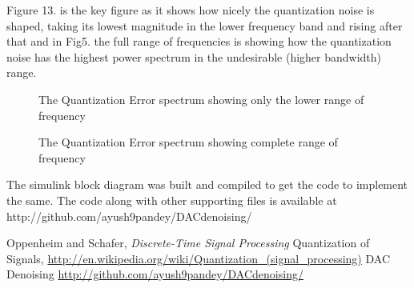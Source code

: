\documentclass[colorlinks=true,pdfstartview=FitV,linkcolor=blue,
            citecolor=red,urlcolor=magenta]{ligodoc}
\begin{document}
Figure 13. is the key figure as it shows how nicely the quantization noise is shaped, taking its lowest magnitude in the lower frequency band and rising after that and in Fig5. the full range of frequencies is showing how the quantization noise has the highest power spectrum in the undesirable (higher bandwidth) range. 
\begin{figure}[htbp]
 
  \centering
  
  \caption{The Quantization Error spectrum showing only the lower range of frequency}
 
\end{figure}

\begin{figure}[htbp]
 
  \centering
  
  \caption{The Quantization Error spectrum showing complete range of frequency}
 
\end{figure}



The simulink block diagram was built and compiled to get the code to implement the same. The code along with other supporting files is available at http://github.com/ayush9pandey/DACdenoising/


\begin{thebibliography}{5}  
 Oppenheim and Schafer, \emph{Discrete-Time Signal Processing}
 Quantization of Signals, \url{http://en.wikipedia.org/wiki/Quantization_(signal_processing)}
 DAC Denoising \url{http://github.com/ayush9pandey/DACdenoising/}
\end{thebibliography}        
\end{document}

